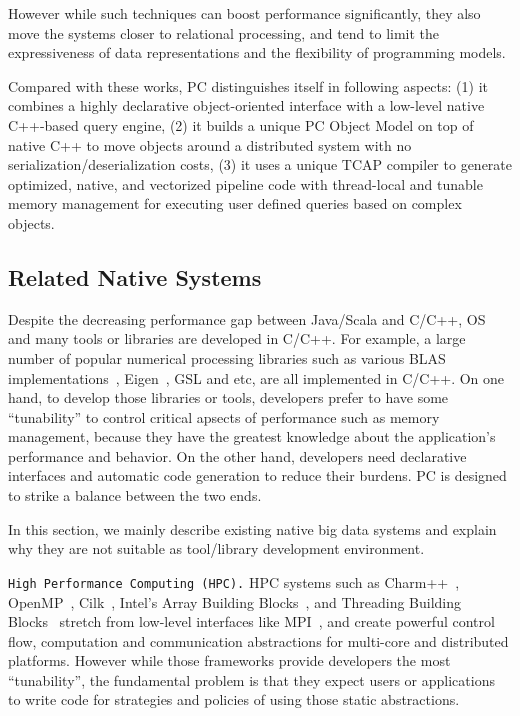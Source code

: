 However while
such techniques can boost performance significantly, they also move the
systems closer to relational processing, and tend to limit the
expressiveness of data representations and the flexibility of
programming models.


\vspace{5pt}
Compared with these works, 
PC distinguishes itself in following aspects:
(1) it combines a highly declarative object-oriented interface with a
low-level native
C++-based query engine, (2) it builds a unique PC Object Model on top of
native C++ to move objects around a distributed system with no
serialization/deserialization costs, (3) it uses a unique TCAP
compiler to generate optimized, native, and vectorized
pipeline code with thread-local and tunable memory management for executing
user defined queries based on complex objects.

\subsection {Related Native Systems}
Despite the decreasing performance gap between Java/Scala and C/C++,
OS and many tools or libraries are developed in C/C++. For example,
a large number of popular numerical processing libraries such as
various BLAS implementations~\cite{barrachina2008evaluation}, Eigen~\cite{eigen}, GSL
and etc, are all implemented in C/C++. 
On one hand, to
develop those libraries or tools, developers prefer to have some ``tunability'' to control critical apsects of performance such as
memory management, because they have the greatest knowledge about the
application's performance and behavior. On the other hand,
developers need declarative interfaces and automatic code generation
to reduce their burdens. PC is designed to strike a balance between
the two ends. 

In this section, we mainly describe existing native big
data systems and explain why they are not suitable as tool/library
development environment.

\vspace{5pt} 
\texttt{High Performance Computing (HPC).} HPC
systems such as Charm++~\cite{kale1993charm++}, OpenMP~\cite{dagum1998openmp}, Cilk~\cite{blumofe1996cilk},  Intel's Array Building
Blocks~\cite{newburn2011intel}, and Threading Building Blocks~\cite{reinders2007intel} stretch from
low-level interfaces like MPI~\cite{gropp1996high}, and create powerful control flow, computation
and communication abstractions for multi-core and distributed
platforms. However while those frameworks provide developers the most
``tunability'', the fundamental problem is that they expect users
or applications to write code for strategies and policies of using
those static abstractions. 


